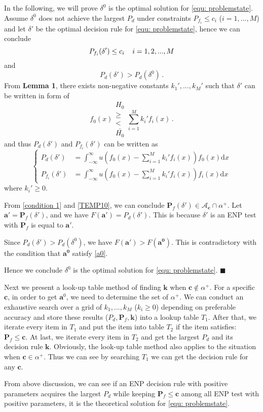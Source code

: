 In the following, we  will prove $\delta^0$ is the optimal solution for \eqref{equ: problemstate}. 
Assume  $\delta^0$ does not achieve the largest $P_d$ under constraints $P_{f_i} \leq c_i$ ($i=1, ..., M$) and let $\delta'$ be the optimal decision rule for \eqref{equ: problemstate}, hence  we can conclude
\begin{equation}
\label{condition 1}
P_{f_i}(\delta') \leq c_i\;\;\;\;i=1, 2, ..., M\\
\end{equation}
and
\begin{equation}
\label{condition 2}
P_{d}(\delta') > P_d(\delta^0)\,.
\end{equation}
From \textbf{Lemma 1}, there exists non-negative constants $k_1', ..., k_M'$ such that $\delta'$ can be written in form of 
\begin{equation}
f_0(x) \substack{H_0 \\ \geq \\ < \\ \bar{H_0}} \sum_{i=1}^{M}k_i'f_i(x)\,.
\end{equation}
and thus $P_d(\delta')$ and $P_{f_i}(\delta')$ can be written as
\begin{equation}
\begin{cases}
\label{TEMP10}
P_{d}(\delta') &= \int_{-\infty}^{\infty} u(f_0(x) - \sum_{i=1}^{M}k_i'f_i(x)) f_0(x) \mathrm{d}x\\
P_{f_i}(\delta') &= \int_{-\infty}^{\infty} u(f_0(x) - \sum_{i=1}^{M}k_i'f_i(x)) f_i(x) \mathrm{d}x
\end{cases}
\end{equation}
where $k_i' \geq 0$.

From \eqref{condition 1} and \eqref{TEMP10}, we can conclude $\mathbf{P}_f(\delta') \in \mathcal{A}_\mathbf{c} \cap \alpha^+$. Let $\mathbf{a}' = \mathbf{P}_f(\delta')$, and we have $F(\mathbf{a}') = P_d(\delta')$. This is because $\delta'$ is an ENP test with $\mathbf{P}_f$ is equal to $\mathbf{a}'$.  

Since $P_d(\delta') > P_d(\delta^0)$, we have $F(\mathbf{a'}) > F(\mathbf{a^0})$. This is contradictory with the condition that $\mathbf{a^0}$ satisfy \eqref{a0}.

Hence we conclude $\delta^0$ is the optimal solution for \eqref{equ: problemstate}. $\blacksquare$

Next we present a look-up table method of finding $\mathbf{k}$ when $\mathbf{c} \notin \alpha^+$. For a specific $\mathbf{c}$, in order to get $\mathbf{a}^0$, we need to determine the set of $\alpha^+$. We can conduct an exhaustive search over a grid of $k_1, ..., k_M$ ($k_i \geq 0$) depending on preferable accuracy and store these results ($P_d, \mathbf{P}_f, \mathbf{k}$) into a lookup table $T_1$. After that, we iterate every item in $T_1$ and put the item into table $T_2$ if the item satisfies:  $\mathbf{P}_f \leq \mathbf{c}$.
At last, we iterate every item in $T_2$ and get the largest $P_d$ and its decision rule $\mathbf{k}$.
Obviously, the look-up table method also applies to the situation when $\mathbf{c} \in \alpha^+$. Thus we can see by searching $T_1$ we can get the decision rule for any $\mathbf{c}$.  

From above discussion, we can see if an ENP decision rule with positive parameters acquires the largest $P_d$ while keeping $\mathbf{P}_f \leq \mathbf{c}$ among all ENP test with positive parameters, it is the theoretical solution for \eqref{equ: problemstate}. 
